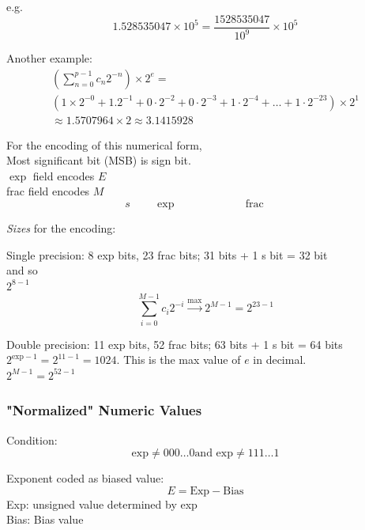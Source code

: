 \documentclass[10pt]{amsart}
\begin{document}
\begin{multicols*}{2}
e.g.
\[
1.528535047 \times 10^5 = \frac{ 1528535047 }{ 10^9 } \times 10^5
\]

Another example:
\[
\begin{gathered}
\left( \sum_{n=0}^{p-1} c_n 2^{-n} \right) \times 2^e = \\
(1 \times 2^{-0} + 1.2^{-1} + 0\cdot 2^{-2} + 0 \cdot 2^{-3} + 1\cdot 2^{-4} + \dots + 1\cdot 2^{-23}) \times 2^1 \\
\approx 1.5707964 \times 2 \approx 3.1415928
\end{gathered}
\]

For the encoding of this numerical form, \\

Most significant bit (MSB) is sign bit. \\

$\exp$ field encodes $E$ \\
frac field encodes $M$ \\

\[
s \qquad \, \exp \qquad \, \qquad \qquad \text{frac} \qquad 
\]

\emph{Sizes} for the encoding:

Single precision: 8 exp bits, 23 frac bits; 31 bits + 1 s bit = 32 bit \\
and so \\
$2^{8-1}$ \\
\[
\sum_{i=0}^{M-1} c_i 2^{-i} \xrightarrow{\text{max}} 2^{M-1} = 2^{23-1}
\]

Double precision: 11 exp bits, 52 frac bits; 63 bits + 1 s bit = 64 bits \\
$2^{\text{exp} - 1} = 2^{11 - 1} = 1024$. This is the max value of $e$ in decimal. \\
$2^{M-1} = 2^{52- 1}$

\subsubsection{"Normalized" Numeric Values}

Condition: \\
\[
\text{exp} \neq 000\dots 0 \text{and } \text{exp} \neq 111 \dots 1
\]

Exponent coded as biased value: \\
\begin{equation}\label{Eqn:ExponentCodingForNonZeroExp}
E = \text{Exp} - \text{Bias} 
\end{equation}
Exp: unsigned value determined by exp \\
Bias: Bias value \\


\end{multicols*}
\end{document}
